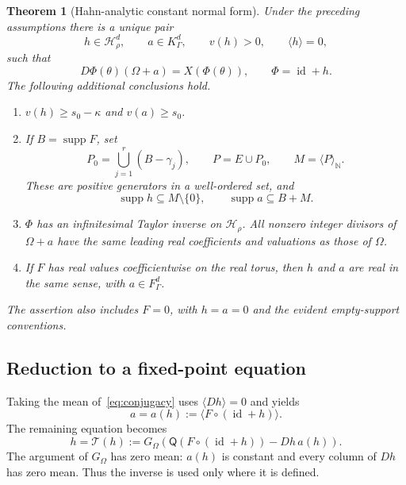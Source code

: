 \documentclass[11pt,letterpaper]{article}
\newtheorem{theorem}{Theorem}[section]
\theoremstyle{definition}
\theoremstyle{remark}
\newcommand{\N}{\mathbb N}
\newcommand{\HH}{\mathcal H}
\newcommand{\supp}{\operatorname{supp}}
\newcommand{\id}{\operatorname{id}}
\newcommand{\mean}[1]{\langle #1\rangle}
\newcommand{\mon}[1]{\langle #1\rangle_{\N}}
\newcommand{\Gom}{G_{\Omega}}
\numberwithin{equation}{section}
\begin{document}
\begin{theorem}[Hahn-analytic constant normal form]\label{thm:nonlinear}
Under the preceding assumptions there is a unique pair
\[
 h\in\HH_\rho^d,\qquad a\in K_\Gamma^d,
 \qquad v(h)>0,\qquad\mean h=0,
\]
such that
\begin{equation}\label{eq:conjugacy}
 D\Phi(\theta)(\Omega+a)=X(\Phi(\theta)),\qquad \Phi=\id+h.
\end{equation}
The following additional conclusions hold.
\begin{enumerate}[label=(\roman*),leftmargin=*]
\item $v(h)\ge s_0-\kappa$ and $v(a)\ge s_0$.
\item If $B=\supp F$, set
\begin{equation}\label{eq:nonlinear-monoid}
 P_0=\bigcup_{j=1}^r(B-\gamma_j),\qquad
 P=E\cup P_0,\qquad M=\mon P.
\end{equation}
These are positive generators in a well-ordered set, and
\[
 \supp h\subseteq M\setminus\{0\},\qquad
 \supp a\subseteq B+M.
\]
\item $\Phi$ has an infinitesimal Taylor inverse on $\HH_\rho$.
All nonzero integer divisors of $\Omega+a$ have the same leading real
coefficients and valuations as those of $\Omega$.
\item If $F$ has real values coefficientwise on the real torus, then $h$
and $a$ are real in the same sense, with $a\in F_\Gamma^d$.
\end{enumerate}
The assertion also includes $F=0$, with $h=a=0$ and the evident empty-support
conventions.
\end{theorem}

\subsection{Reduction to a fixed-point equation}

Taking the mean of~\eqref{eq:conjugacy} uses $\mean{Dh}=0$ and yields
\begin{equation}\label{eq:drift}
 a=a(h):=\mean{F\circ(\id+h)}.
\end{equation}
The remaining equation becomes
\begin{equation}\label{eq:fixed-point}
 h=\mathcal T(h):=
 \Gom\left(\mathsf Q(F\circ(\id+h))-Dh\,a(h)\right).
\end{equation}
The argument of $\Gom$ has zero mean: $a(h)$ is constant and every column
of $Dh$ has zero mean.  Thus the inverse is used only where it is defined.
\end{document}
